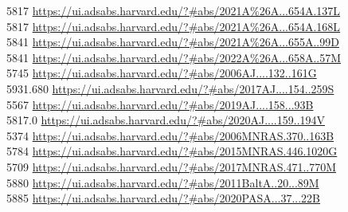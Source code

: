 5817 \url{https://ui.adsabs.harvard.edu/?#abs/2021A%26A...654A.137L}\\
5817 \url{https://ui.adsabs.harvard.edu/?#abs/2021A%26A...654A.168L}\\
5841 \url{https://ui.adsabs.harvard.edu/?#abs/2021A%26A...655A..99D}\\
5841 \url{https://ui.adsabs.harvard.edu/?#abs/2022A%26A...658A..57M}\\
5745 \url{https://ui.adsabs.harvard.edu/?#abs/2006AJ....132..161G}\\
5931.680 \url{https://ui.adsabs.harvard.edu/?#abs/2017AJ....154..259S}\\
5567 \url{https://ui.adsabs.harvard.edu/?#abs/2019AJ....158...93B}\\
5817.0 \url{https://ui.adsabs.harvard.edu/?#abs/2020AJ....159..194V}\\
5374 \url{https://ui.adsabs.harvard.edu/?#abs/2006MNRAS.370..163B}\\
5784 \url{https://ui.adsabs.harvard.edu/?#abs/2015MNRAS.446.1020G}\\
5709 \url{https://ui.adsabs.harvard.edu/?#abs/2017MNRAS.471..770M}\\
5880 \url{https://ui.adsabs.harvard.edu/?#abs/2011BaltA..20...89M}\\
5885 \url{https://ui.adsabs.harvard.edu/?#abs/2020PASA...37...22B}\\

